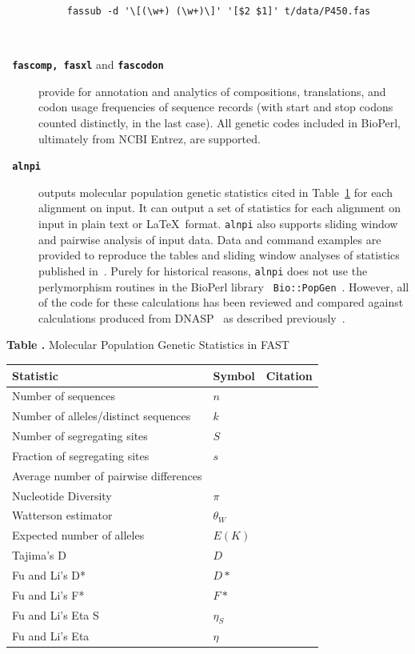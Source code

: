 \documentclass{frontiersSCNS} %
\begin{document}
\begin{description}
 \begin{verbatim}
     fassub -d '\[(\w+) (\w+)\]' '[$2 $1]' t/data/P450.fas
\end{verbatim}
\\
\item[\texttt{\textbf{  fascomp, fasxl}} and \texttt{\textbf{fascodon}} ] provide for
annotation and analytics of compositions, translations, and codon
usage frequencies of sequence records (with start and stop codons
counted distinctly, in the last case). All genetic codes included in
BioPerl, ultimately from NCBI Entrez, are supported.
\\
\item[\texttt{\textbf{ alnpi}} ] outputs molecular population genetic
  statistics cited in Table~\ref{tab:pgstats} for each alignment on
  input. It can output a set of statistics for each alignment on input
  in plain text or \LaTeX~format. {\tt alnpi} also supports sliding
  window and pairwise analysis of input data. Data and command
  examples are provided to reproduce the tables and sliding window
  analyses of statistics published in~\citep{Ardell03}.  Purely for
  historical reasons, {\tt alnpi} does not use the perlymorphism
  routines in the BioPerl library {\tt
    Bio::PopGen}~\citep{stajich_disentangling_2005}. However, all of
  the code for these calculations has been reviewed and compared
  against calculations produced from DNASP~\citep{Librado01062009} as
  described previously~\citep{Ardell12082004}.
\\
\end{description}

\begin{table}[!t]
\textbf{\label{tab:pgstats} Table .}{
  Molecular Population Genetic Statistics in FAST }

\processtable{ }
{\begin{tabular}{lll}\toprule
    Statistic  & Symbol  & Citation \\
\midrule
Number of sequences & $n$ & \\
Number of alleles/distinct sequences & $k$ & \\
Number of segregating sites & $S$ & \\
Fraction of segregating sites & $s$ & \\
Average number of pairwise differences &  & \citep{NeiLi79} \\
Nucleotide Diversity & $\pi$ &  \citep{NeiLi79} \\
Watterson estimator & $\theta_W$ & \citep{watterson1975number} \\
Expected number of alleles & $E(K)$ & \citep{ewens1972sampling} \\
Tajima's D & $D$ & \citep{Tajima89c} \\
Fu and Li's D* & $D*$ & \citep{FuLi93b} \\
Fu and Li's F* & $F*$ & \citep{FuLi93b,SimonsenEtAl95} \\
Fu and Li's Eta S & $\eta_S$ &  \citep{FuLi93b} \\
Fu and Li's Eta & $\eta$ &  \citep{FuLi93b} \\
\end{tabular}}{}
\end{table}
\end{document}
